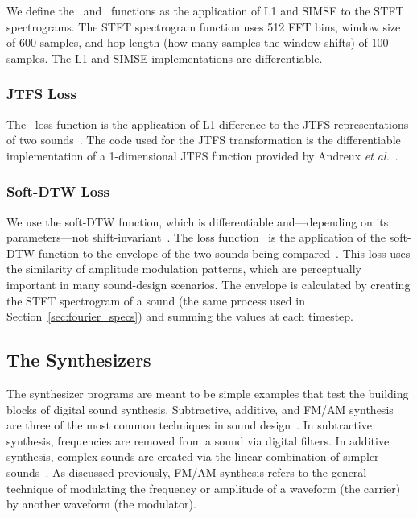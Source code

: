 We define the \LoneSpec~and \SIMSESpec~functions as the application of L1 and SIMSE to the STFT spectrograms. The STFT spectrogram function uses 512 FFT bins, window size of 600 samples, and hop length (how many samples the window shifts) of 100 samples. The L1 and SIMSE implementations are differentiable. 

\subsubsection{JTFS Loss}
The \JTFS~loss function is the application of L1 difference to the JTFS representations of two sounds~\cite{vahidi2023mesostructures}. The code used for the JTFS transformation is the differentiable implementation of a 1-dimensional JTFS function provided by Andreux \textit{et al.}~\cite{kymatio}. 

\subsubsection{Soft-DTW Loss}
We use the soft-DTW function, which is differentiable and---depending on its parameters---not shift-invariant~\cite{cuturi2017soft,janati2020spatio,tavenard.blog.softdtw}. The loss function \DTWEnv~is the application of the soft-DTW function to the envelope of the two sounds being compared~\cite{lyons1997understanding}. This loss uses the similarity of amplitude modulation patterns, which are perceptually important in many sound-design scenarios. The envelope is calculated by creating the STFT spectrogram of a sound (the same process used in Section~\ref{sec:fourier_specs}) and summing the values at each timestep. 

\subsection{The Synthesizers}
\label{sec:programs}
The synthesizer programs are meant to be simple examples that test the building blocks of digital sound synthesis. Subtractive, additive, and FM/AM synthesis are three of the most common techniques in sound design~\cite{smith1991viewpoints}. In subtractive synthesis, frequencies are removed from a sound via digital filters. In additive synthesis, complex sounds are created via the linear combination of simpler sounds~\cite{lyons1997understanding,smith2007introduction}. As discussed previously, FM/AM synthesis refers to the general technique of modulating the frequency or amplitude of a waveform (the carrier) by another waveform (the modulator).


